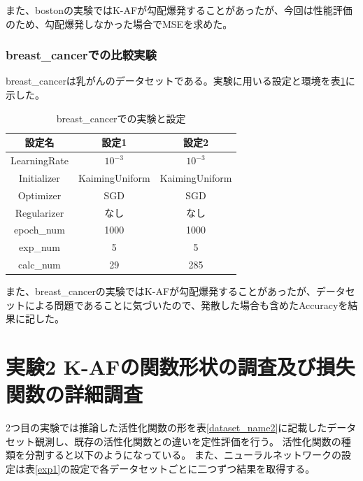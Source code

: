 また、bostonの実験ではK-AFが勾配爆発することがあったが、今回は性能評価のため、勾配爆発しなかった場合でMSEを求めた。


\subsubsection{breast\_cancerでの比較実験}
\label{impl:breastcancer}

breast\_cancerは乳がんのデータセットである。実験に用いる設定と環境を表\ref{exp:breastcancer}に示した。

\begin{table}[htbp]
    \begin{center}
        \caption{breast\_cancerでの実験と設定}
        \label{exp:breastcancer}
        \vspace{2mm} 
        \begin{tabular}{ |c|c|c| }
        \hline
        設定名 & 設定1 & 設定2 \\
        \hline
        LearningRate         & $ 10^{-3} $ & $ 10^{-3} $ \\
        \hline
        Initializer       & KaimingUniform & KaimingUniform \\
        \hline
        Optimizer           & SGD & SGD \\
        \hline
        Regularizer     & なし & なし \\
        \hline
        epoch\_num       & 1000 &  1000 \\
        \hline
        exp\_num         & 5 & 5 \\
        \hline
        calc\_num        & 29 & 285 \\
        \hline
        \end{tabular}
    \end{center}
\end{table}

また、breast\_cancerの実験ではK-AFが勾配爆発することがあったが、データセットによる問題であることに気づいたので、発散した場合も含めたAccuracyを結果に記した。

\vspace{-5mm} 

\section{実験2 K-AFの関数形状の調査及び損失関数の詳細調査}
\label{exp2}

2つ目の実験では推論した活性化関数の形を表\ref{dataset_name2}に記載したデータセット観測し、既存の活性化関数との違いを定性評価を行う。
活性化関数の種類を分割すると以下のようになっている。
また、ニューラルネットワークの設定は表\ref{exp1}の設定で各データセットごとに二つずつ結果を取得する。


